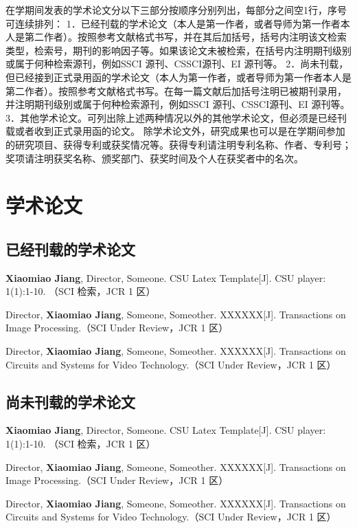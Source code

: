 \begin{additional}
在学期间发表的学术论文分以下三部分按顺序分别列出，每部分之间空1行，序号可连续排列：
1．已经刊载的学术论文（本人是第一作者，或者导师为第一作者本人是第二作者）。按照参考文献格式书写，并在其后加括号，括号内注明该文检索类型，检索号，期刊的影响因子等。如果该论文未被检索，在括号内注明期刊级别或属于何种检索源刊，例如SSCI 源刊、CSSCI源刊、EI 源刊等。
2．尚未刊载，但已经接到正式录用函的学术论文（本人为第一作者，或者导师为第一作者本人是第二作者）。按照参考文献格式书写。在每一篇文献后加括号注明已被期刊录用，并注明期刊级别或属于何种检索源刊，例如SSCI 源刊、CSSCI源刊、EI 源刊等。
3．其他学术论文。可列出除上述两种情况以外的其他学术论文，但必须是已经刊载或者收到正式录用函的论文。
除学术论文外，研究成果也可以是在学期间参加的研究项目、获得专利或获奖情况等。获得专利请注明专利名称、作者、专利号；奖项请注明获奖名称、颁奖部门、获奖时间及个人在获奖者中的名次。
\section*{学术论文}
\subsection*{已经刊载的学术论文}
\noindent
\begin{enumerate}[label={[\arabic*]}]
\item \textbf{Xiaomiao Jiang}, Director, Someone. CSU Latex Template[J]. CSU player: 1(1):1-10. （SCI 检索，JCR 1 区）
\item Director, \textbf{Xiaomiao Jiang}, Someone, Someother. XXXXXX[J]. Transactions on Image Processing.（SCI Under Review，JCR 1 区）
\item Director, \textbf{Xiaomiao Jiang}, Someone, Someother. XXXXXX[J]. Transactions on Circuits and Systems for Video Technology.（SCI Under Review，JCR 1 区）
\end{enumerate}


\subsection*{尚未刊载的学术论文}
\noindent
\begin{enumerate}[label={[\arabic*]}]
\item \textbf{Xiaomiao Jiang}, Director, Someone. CSU Latex Template[J]. CSU player: 1(1):1-10. （SCI 检索，JCR 1 区）
\item Director, \textbf{Xiaomiao Jiang}, Someone, Someother. XXXXXX[J]. Transactions on Image Processing.（SCI Under Review，JCR 1 区）
\item Director, \textbf{Xiaomiao Jiang}, Someone, Someother. XXXXXX[J]. Transactions on Circuits and Systems for Video Technology.（SCI Under Review，JCR 1 区）
\end{enumerate}


\end{additional}
